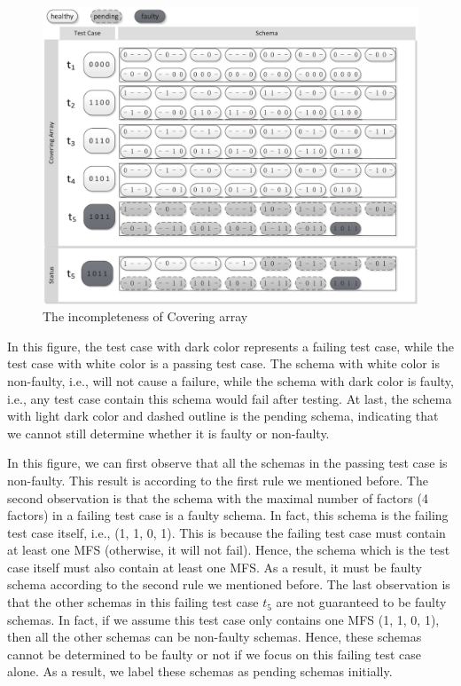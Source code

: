 \begin{figure}[!ht]
 \centering
 \includegraphics[width=5.6in]{ca.pdf}
 \caption{The incompleteness of Covering array }
 \label{fig_inc_ca}
\end{figure}

In this figure, the test case with dark color represents a failing test case, while the test case with white color is a passing test case. The schema with white color is non-faulty, i.e., will not cause a failure, while the schema with dark color is faulty, i.e., any test case contain this schema would fail after testing. At last, the schema with light dark color and dashed outline is the pending schema, indicating that we cannot still determine whether it is faulty or non-faulty.

In this figure, we can first observe that all the schemas in the passing test case is non-faulty. This result is according to the first rule we mentioned before. The second observation is that the schema with the maximal number of factors (4 factors) in a failing test case is a faulty schema. In fact, this schema is the failing test case itself, i.e., (1, 1, 0, 1). This is because the failing test case must contain at least one MFS (otherwise, it will not fail). Hence, the schema which is the test case itself must also contain at least one MFS. As a result, it must be faulty schema according to the second rule we mentioned before. The last observation is that the other schemas in this failing test case $t_{5}$ are not guaranteed to be faulty schemas. In fact, if we assume this test case only contains one MFS (1, 1, 0, 1), then all the other schemas can be non-faulty schemas. Hence, these schemas cannot be determined to be faulty or not if we focus on this failing test case alone. As a result, we label these schemas as pending schemas initially.

